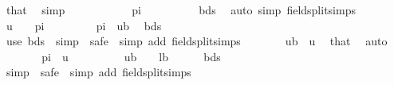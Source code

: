 \begin{isabellebody}
\ that\ \isamarkupfalse%
\ simp\isanewline
\ \ \ \ \isamarkupfalse%
\ \isamarkupfalse%
\ {\isachardoublequoteopen}{\isasymdots}\ {\isacharless}{\kern0pt}\ {\isacharparenleft}{\kern0pt}{}\ {\isacharasterisk}{\kern0pt}\ pi{\isacharparenright}{\kern0pt}\ {\isacharslash}{\kern0pt}\ {}{\isachardoublequoteclose}\isanewline
\ \ \ \ \ \ \isamarkupfalse%
\ bds\ \isamarkupfalse%
\ {\isacharparenleft}{\kern0pt}auto\ simp{\isacharcolon}{\kern0pt}\ field{\isacharunderscore}{\kern0pt}split{\isacharunderscore}{\kern0pt}simps{\isacharparenright}{\kern0pt}\isanewline
\ \ \ \ \isamarkupfalse%
\ \isamarkupfalse%
\ {\isachardoublequoteopen}u\ {\isacharless}{\kern0pt}\ {}\ {\isacharasterisk}{\kern0pt}\ pi\ {\isacharslash}{\kern0pt}\ {}{\isachardoublequoteclose}\ \isakeywordONE{{\isachardot}{\kern0pt}}\isamarkupfalse%
\isanewline
\ \ \ \ \isamarkupfalse%
\ {\isachardoublequoteopen}pi\ {\isacharless}{\kern0pt}\ {}{\isacharslash}{\kern0pt}ub{\isachardoublequoteclose}\ \isamarkupfalse%
\ bds\ \isamarkupfalse%
\ {\isacharparenleft}{\kern0pt}use\ bds\ \ simp\ {\isacharbar}{\kern0pt}\ safe\ {\isacharbar}{\kern0pt}\ simp\ add{\isacharcolon}{\kern0pt}\ field{\isacharunderscore}{\kern0pt}split{\isacharunderscore}{\kern0pt}simps{\isacharparenright}{\kern0pt}{\isacharplus}{\kern0pt}\isanewline
\ \ \ \ \isamarkupfalse%
\ \isamarkupfalse%
\ {\isachardoublequoteopen}{}{\isacharslash}{\kern0pt}ub\ {\isasymle}\ u{\isachardoublequoteclose}\ \isamarkupfalse%
\ that\ \isamarkupfalse%
\ auto\isanewline
\ \ \ \ \isamarkupfalse%
\ \isamarkupfalse%
\ {\isachardoublequoteopen}pi\ {\isacharless}{\kern0pt}\ u{\isachardoublequoteclose}\ \isakeywordONE{{\isachardot}{\kern0pt}}\isamarkupfalse%
\isanewline
\ \ \isamarkupfalse%
\isanewline
\isanewline
\ \ \isamarkupfalse%
\ {\isachardoublequoteopen}{}\ {\isacharslash}{\kern0pt}\ ub\ {\isasymle}\ {}\ {\isacharslash}{\kern0pt}\ lb{\isachardoublequoteclose}\isanewline
\ \ \ \ \isamarkupfalse%
\ bds\ \isamarkupfalse%
\ {\isacharparenleft}{\kern0pt}simp\ {\isacharbar}{\kern0pt}\ safe\ {\isacharbar}{\kern0pt}\ simp\ add{\isacharcolon}{\kern0pt}\ field{\isacharunderscore}{\kern0pt}split{\isacharunderscore}{\kern0pt}simps{\isacharparenright}{\kern0pt}{\isacharplus}{\kern0pt}\isanewline

\end{isabellebody}
